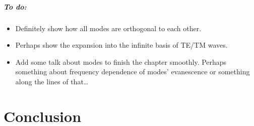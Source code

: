 \documentclass[11pt,a4paper,twoside,openany]{report}
\begin{document}
\paragraph{To do:}
\begin{itemize}
    \item Definitely show how all modes are orthogonal to each other.
    \item Perhaps show the expansion into the infinite basis of TE/TM waves.
    \item Add some talk about modes to finish the chapter smoothly. Perhaps something about frequency dependence of modes' evanescence or something along the lines of that\dots
\end{itemize}


\chapter*{Conclusion}
\label{chap:conclusion}

\lipsum[10-13]

\printnomenclature

\printbibliography[heading=bibintoc]

\printindex
\end{document}
